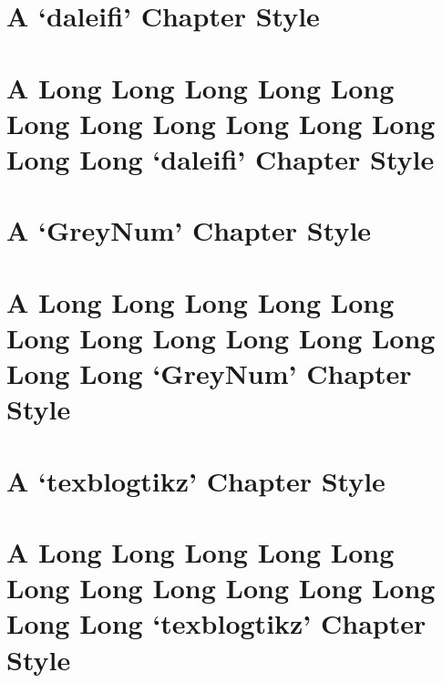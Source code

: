 \documentclass[10pt,a4paper,extrafontsizes,oldfontcommands,oneside]{memoir}
\begin{document}
\chapter{A `daleifi' Chapter Style} %
\label{chap:a_daleifi_chapter_style}



\chapter{A Long Long Long Long Long Long Long Long Long Long Long Long Long `daleifi' Chapter Style} %
\label{chap:a_long_daleifi_chapter_style}



\chapter{A `GreyNum' Chapter Style} %
\label{chap:a_GreyNum_chapter_style}



\chapter{A Long Long Long Long Long Long Long Long Long Long Long Long Long `GreyNum' Chapter Style} %
\label{chap:a_long_GreyNum_chapter_style}



\chapter{A `texblogtikz' Chapter Style} %
\label{chap:a_texblogtikz_chapter_style}



\chapter{A Long Long Long Long Long Long Long Long Long Long Long Long Long `texblogtikz' Chapter Style} %
\label{chap:a_long_texblogtikz_chapter_style}

\end{document}
